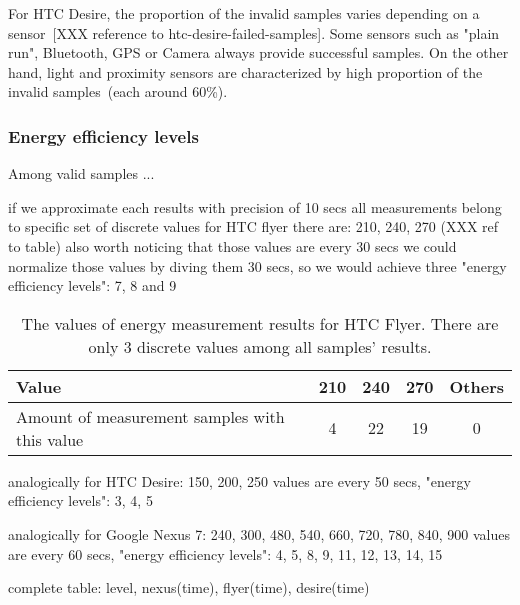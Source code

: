 
For HTC Desire, the proportion of the invalid samples varies depending on a sensor\ [XXX reference to htc-desire-failed-samples]. Some sensors such as "plain run", Bluetooth, GPS or Camera always provide successful samples. On the other hand, light and proximity sensors are characterized by high proportion of the invalid samples\ (each around 60\%). 



\subsubsection{Energy efficiency levels}
	Among valid samples ...
	
	if we approximate each results with precision of 10 secs
	all measurements belong to specific set of discrete values
		for HTC flyer there are: 210, 240, 270 (XXX ref to table)
		also worth noticing that those values are every 30 secs
		we could normalize those values by diving them 30 secs,
			so we would achieve three "energy efficiency levels": 7, 8 and 9
			
\begin{center}
	\begin{table}
    \begin{tabular}{| l | c | c | c | c |}
    \hline
      Value & 210 & 240 & 270 & Others\\ \hline
    Amount of measurement samples with this value & 4 & 22 &  19 & 0\\ \hline
    \end{tabular}
    \caption{The values of energy measurement results for HTC Flyer. There are only 3 discrete values among all samples' results.}
	\label{table:discrete_values}
	\end{table}
\end{center}		
			
		analogically for HTC Desire: 150, 200, 250
			values are every 50 secs, "energy efficiency levels": 3, 4, 5
		
		analogically for Google Nexus 7: 240, 300, 480, 540, 660, 720, 780, 840, 900
			values are every 60 secs, "energy efficiency levels": 4, 5, 8, 9, 11, 12, 13, 14, 15
			
		complete table:
			level, nexus(time), flyer(time), desire(time)
			

